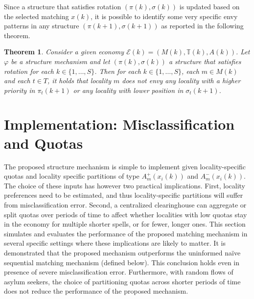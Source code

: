 \documentclass[12pt,fleqn]{article}
\newtheorem{theorem}{Theorem}
\begin{document}
\noindent Since a structure that satisfies rotation $(\pi(k),\sigma(k))$ is updated based on the selected matching $x(k)$, it is possible to identify some very specific envy patterns in any structure $(\pi(k+1),\sigma(k+1))$ as reported in the following theorem.
\begin{theorem}\rm\label{TH:structures}
Consider a given economy $\mathcal{E}(k)=(M(k),\mathbb{T}(k),A(k))$. Let $\varphi$ be a structure mechanism and let $(\pi(k),\sigma(k))$ a structure that satisfies rotation for each $k\in \{1,\ldots,S\}$. Then for each
$k\in\{1,\ldots,S\}$, each $m\in M(k)$ and each $t\in T$, it holds that locality $m$ does not envy any
locality with a higher priority in $\pi_t(k+1)$ or any locality with lower position in $\sigma_t(k+1)$.
\end{theorem}

\section{Implementation: Misclassification and Quotas}\label{SEC:simulations}
The proposed structure mechanism is simple to implement given locality-specific quotas and locality specific partitions of type $A^+_m(x_i(k))$ and $A^-_m(x_i(k))$. The choice of these inputs has however two practical implications. First, locality preferences need to be estimated, and thus locality-specific partitions will suffer from misclassification error. Second, a centralized clearinghouse can aggregate or split quotas over periods of time to affect whether localities with low quotas stay in the economy for multiple shorter spells, or for fewer, longer ones. This section simulates and evaluates the performance of the proposed matching mechanism in several specific settings where these implications are likely to matter. It is demonstrated that the proposed mechanism outperforms the uninformed na\"{i}ve sequential matching mechanism (defined below). This conclusion holds even in presence of severe misclassification error. Furthermore, with random flows of asylum seekers, the choice of partitioning quotas across shorter periods of time does not reduce the performance of the proposed mechanism.
\end{document}
